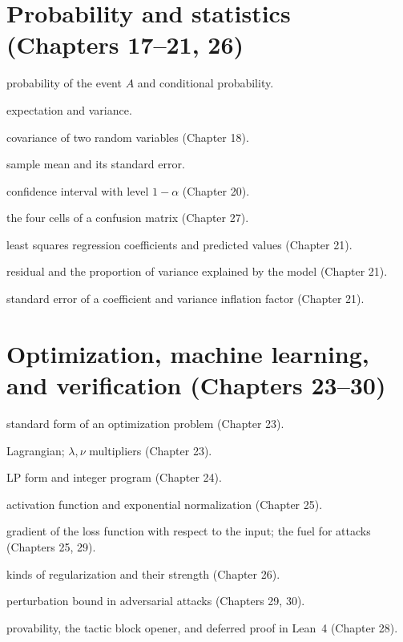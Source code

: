 \section*{Probability and statistics (Chapters 17--21, 26)}
\begin{description}[style=nextline,itemsep=0.25em]
  \item[$P(A)$, $P(A\mid B)$] probability of the event $A$ and conditional probability.
  \item[{$\mathbb{E}[X]$, $\operatorname{Var}X$}] expectation and variance.
  \item[$\operatorname{Cov}(X,Y)$] covariance of two random variables (Chapter 18).
  \item[$\bar{X}_n$, $\mathrm{se}$] sample mean and its standard error.
  \item[$\mathrm{CI}_{1-\alpha}$] confidence interval with level
        $1-\alpha$ (Chapter 20).
  \item[$\mathrm{TP}$, $\mathrm{FP}$, $\mathrm{FN}$, $\mathrm{TN}$] the four cells of
        a confusion matrix (Chapter 27).
  \item[$\hat{\beta}$, $\hat{y}=X\hat{\beta}$] least squares regression
        coefficients and predicted values (Chapter 21).
  \item[$e_i=y_i-\hat{y}_i$, $R^2$] residual and the proportion of variance explained
        by the model (Chapter 21).
  \item[$\mathrm{se}(\hat{\beta}_j)$, $\mathrm{VIF}_j$] standard error of a coefficient and
        variance inflation factor (Chapter 21).
\end{description}

\section*{Optimization, machine learning, and verification (Chapters 23--30)}
\begin{description}[style=nextline,itemsep=0.25em]
  \item[$\min f_0(x)$ with $f_i(x)\le 0$] standard form of an optimization problem (Chapter 23).
  \item[$L(x,\lambda,\nu)$] Lagrangian; $\lambda,\nu$ multipliers (Chapter 23).
  \item[$c^{\top}x$, $Ax\le b$, $x\in\mathbb{Z}^n$] LP form and integer program
        (Chapter 24).
  \item[$\sigma(\cdot)$, $\mathrm{softmax}$] activation function and exponential
        normalization (Chapter 25).
  \item[$\nabla_{\mathbf{x}}\ell$] gradient of the loss function with respect to the input;
        the fuel for attacks (Chapters 25, 29).
  \item[$L_2$, $L_1$, $\lambda_{\text{reg}}$] kinds of regularization and their strength
        (Chapter 26).
  \item[$\|\delta\|_{\infty}\le\varepsilon$] perturbation bound in adversarial
        attacks (Chapters 29, 30).
  \item[$\vdash$, \texttt{by}, \texttt{sorry}] provability, the tactic block opener,
        and deferred proof in Lean~4 (Chapter 28).
\end{description}
